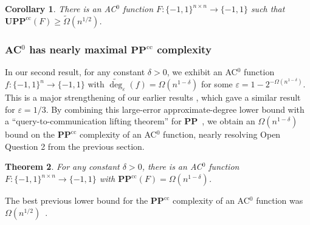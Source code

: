\documentclass[11pt]{article}
\numberwithin{equation}{section}
\newtheorem{theorem}{Theorem}[section]
\newtheorem{corollary}[theorem]{Corollary}
\theoremstyle{definition}
\theoremstyle{plain}
\newcommand{\bits}{\{-1,1\}}
\newcommand{\PP}{\mathbf{PP}}
\newcommand{\UPP}{\mathbf{UPP}}
\newcommand{\eps}{\varepsilon}
\newcommand{\adeg}{\widetilde{\operatorname{deg}}}
\begin{document}
\begin{corollary} \label{cor:signrank}
	There is an AC$^0$
	function $F \colon \bits^{n \times n} \to \bits$ 
	such that $\UPP^{\text{cc}}(F) \geq \tilde{\Omega}(n^{1/2})$.
\end{corollary} 


\subsubsection{\texorpdfstring{AC$^0$ has nearly maximal $\PP^{\text{cc}}$
    complexity}{AC0 has nearly maximal PPcc complexity}}
\label{s:discintro}
In our second result, for any constant $\delta > 0$, we exhibit an AC$^0$ function $f \colon \bits^n \to \bits$ with $\adeg_{\eps}(f) = \Omega(n^{1-\delta})$
for some $\eps= 1-2^{-\Omega(n^{1-\delta})}$. This is a major strengthening
of our %
earlier results \cite{adegsurj, bkt},
which
%
gave  %
a similar result for $\eps=1/3$.
By combining this large-error approximate-degree %
lower bound
with a ``query-to-communication lifting theorem'' for $\PP$~\cite{patmat}, we obtain an $\Omega(n^{1-\delta})$ bound on the $\PP^{\text{cc}}$ complexity
of an AC$^0$ function, nearly resolving Open Question 2 from the previous section. 

\begin{theorem} \label{discthm} \label{thm:discintro}
	For any constant $\delta > 0$, there is an AC$^0$ function $F \colon \bits^{n \times n} \to \bits$ with $\PP^{\text{cc}}(F) = \Omega(n^{1-\delta})$.
\end{theorem}

\label{s:disc}


The best previous lower bound for the $\PP^{\text{cc}}$ complexity of an AC$^0$ function was  $\Omega(n^{1/2})$~\cite{sherstov15}.

%
%
\end{document}

